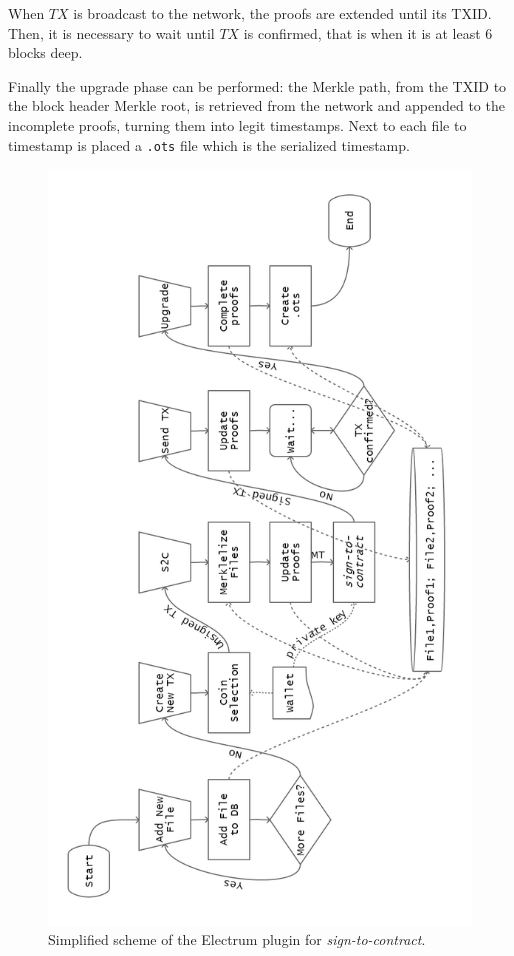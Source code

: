 When $TX$ is broadcast to the network, the proofs are extended until its TXID.
Then, it is necessary to wait until $TX$ is confirmed, that is when it is at least 6 blocks deep. 

Finally the upgrade phase can be performed: the Merkle path, from the TXID to the block header Merkle root, is retrieved from the network and appended to the incomplete proofs, turning them into legit timestamps.
Next to each file to timestamp is placed a \verb|.ots| file which is the serialized timestamp.

\begin{figure}
	\begin{center}
		\includegraphics[width=0.75\linewidth]{Images/plugin-working.png}
		\caption[Simplified scheme of the Electrum plugin]{Simplified scheme of the Electrum plugin for \textit{sign-to-contract}.}
		\label{fig:plugin-scheme}
	\end{center}
\end{figure}